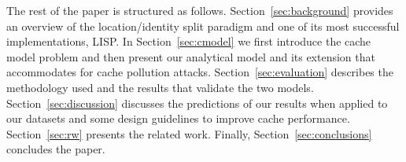 The rest of the paper is structured as follows. Section~\ref{sec:background}
provides an overview of the location/identity split paradigm and one of its
most successful implementations, LISP. In Section~\ref{sec:cmodel} we first
introduce the cache model problem and then present our analytical model and
its extension that accommodates for cache pollution attacks.
Section~\ref{sec:evaluation} describes the methodology used and the results
that validate the two models.  Section~\ref{sec:discussion} discusses the
predictions of our results when applied to our datasets and some design
guidelines to improve cache performance. Section~\ref{sec:rw} presents the
related work. Finally, Section~\ref{sec:conclusions} concludes the paper.
